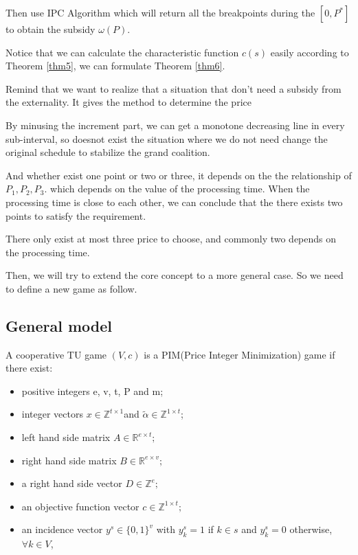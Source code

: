 Then use IPC Algorithm which will return all the breakpoints during the $[0, P^*]$ to obtain the subsidy $\omega(P)$.

Notice that we can calculate the characteristic function $c(s)$ easily according to Theorem \ref{thm5}, we can formulate Theorem \ref{thm6}.


Remind that we want to realize that a situation that don't need a subsidy from the externality.
It gives the method to determine the price

By minusing the increment part, we can get a monotone decreasing line in every sub-interval, so doesnot exist the situation where we do not need change the original schedule to stabilize the grand coalition.

And whether exist one point or two or three, it depends on the the relationship of $P_1,P_2, P_3$.
which depends on the value of the processing time. When the processing time is close to each other, we can conclude that the there exists two points to satisfy the requirement.

There only exist at most three price to choose, and commonly two depends on the processing time.


Then, we will try to extend the core concept to a more general case. So we need to define a new game as follow.

\subsection*{General model}

A cooperative TU game $(V,c)$ is a PIM(Price Integer Minimization) game if there exist:

\begin{itemize}
	\item positive integers e, v, t, P and m;
	\item integer vectors $ x \in \mathbb{Z}^{t \times 1} $and $ \tilde{\alpha} \in \mathbb{Z}^{1 \times t} $;
	\item left hand side matrix  $A \in \mathbb{R} ^{e \times t};$
	\item right hand side matrix $B \in \mathbb{R} ^ {e \times v};$
	\item a right hand side vector $D \in \mathbb{Z} ^ {e};$
	\item an objective function vector
	$c \in \mathbb{Z}^{1 \times t};$
	\item an incidence vector $y^s \in \{0,1\}^v$ with $y^s_k = 1$ if $k \in s$ and $y^s_k = 0 $ otherwise, $\forall k \in V$,

\end{itemize}

